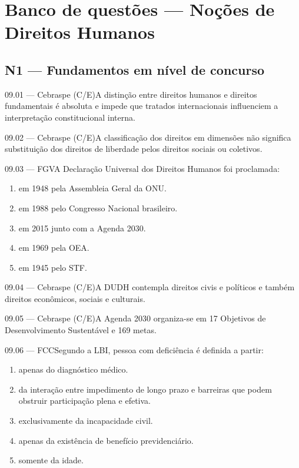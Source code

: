 \section{Banco de questões — Noções de Direitos Humanos}

\subsection*{N1 — Fundamentos em nível de concurso}
\begin{questao}{ 09.01 — Cebraspe (C/E)}A distinção entre direitos humanos e direitos fundamentais é absoluta e impede que tratados internacionais influenciem a interpretação constitucional interna.\end{questao}
\begin{questao}{ 09.02 — Cebraspe (C/E)}A classificação dos direitos em dimensões não significa substituição dos direitos de liberdade pelos direitos sociais ou coletivos.\end{questao}
\begin{questao}{ 09.03 — FGV}A Declaração Universal dos Direitos Humanos foi proclamada:\begin{enumerate}[label=\Alph*)]\item em 1948 pela Assembleia Geral da ONU.\item em 1988 pelo Congresso Nacional brasileiro.\item em 2015 junto com a Agenda 2030.\item em 1969 pela OEA.\item em 1945 pelo STF.\end{enumerate}\end{questao}
\begin{questao}{ 09.04 — Cebraspe (C/E)}A DUDH contempla direitos civis e políticos e também direitos econômicos, sociais e culturais.\end{questao}
\begin{questao}{ 09.05 — Cebraspe (C/E)}A Agenda 2030 organiza-se em 17 Objetivos de Desenvolvimento Sustentável e 169 metas.\end{questao}
\begin{questao}{ 09.06 — FCC}Segundo a LBI, pessoa com deficiência é definida a partir:\begin{enumerate}[label=\Alph*)]\item apenas do diagnóstico médico.\item da interação entre impedimento de longo prazo e barreiras que podem obstruir participação plena e efetiva.\item exclusivamente da incapacidade civil.\item apenas da existência de benefício previdenciário.\item somente da idade.\end{enumerate}\end{questao}
